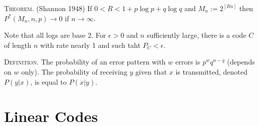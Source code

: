 \documentclass{article}
\renewcommand{\=}{\equiv}
\newcommand{\ra}{\rightarrow}
\newcommand{\header}[1]{\vspace{1em}\noindent\textsc{#1.} }
\begin{document}
\header{Theorem} (Shannon 1948)
If $0 < R < 1 + p \log p + q \log q$ and $M_n := 2^{[Rn]}$ then $P^*(M_n, n, p) \ra 0$ if $n \ra \infty$.

Note that all logs are base 2.
For $\epsilon > 0$ and $n$ sufficiently large, there is a code $C$ of length $n$ with rate nearly 1 and such taht $P_C < \epsilon$.

\header{Definition}
The probability of an error pattern with $w$ errors is $p^w q^{n-q}$ (depends on $w$ only).
The probability of receiving $y$ given that $x$ is transmitted, denoted $P(y|x)$, is equal to $P(x|y)$.



\setcounter{section}{2}
\section{Linear Codes}
\end{document}
